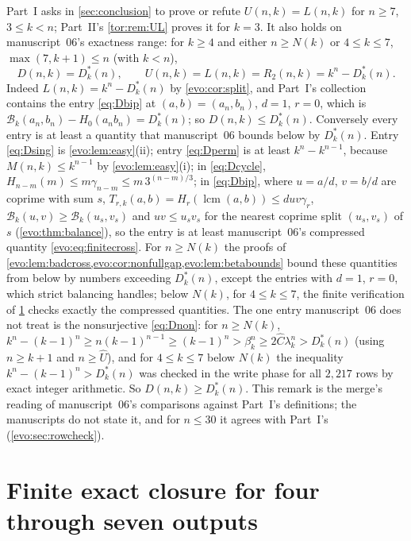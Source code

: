 \documentclass[11pt,a4paper]{article}
\numberwithin{equation}{section}
\theoremstyle{definition}
\theoremstyle{remark}
\newcommand{\lcm}{\operatorname{lcm}}
\newcommand{\Bip}{\mathcal B}
\begin{document}
\begin{remark}\label{evo:rem:UL}
Part~I asks in \cref{sec:conclusion} to prove or refute $U(n,k)=L(n,k)$ for
$n\ge7$, $3\le k<n$; Part~II's \cref{tor:rem:UL} proves it for $k=3$. It also
holds on manuscript~06's exactness range: for $k\ge4$ and either $n\ge N(k)$
or $4\le k\le7$, $\max(7,k+1)\le n$ (with $k<n$),
\[
 D(n,k)=D^*_k(n),\qquad U(n,k)=L(n,k)=R_2(n,k)=k^n-D^*_k(n).
\]
Indeed $L(n,k)=k^n-D^*_k(n)$ by \cref{evo:cor:split}, and Part~I's collection
contains the entry \eqref{eq:Dbip} at $(a,b)=(a_n,b_n)$, $d=1$, $r=0$, which
is $\Bip_k(a_n,b_n)-H_0(a_nb_n)=D^*_k(n)$; so $D(n,k)\le D^*_k(n)$. Conversely
every entry is at least a quantity that manuscript~06 bounds below by
$D^*_k(n)$. Entry \eqref{eq:Dsing} is \cref{evo:lem:easy}(ii); entry
\eqref{eq:Dperm} is at least $k^n-k^{n-1}$, because $M(n,k)\le k^{n-1}$ by
\cref{evo:lem:easy}(i); in \eqref{eq:Dcycle},
$H_{n-m}(m)\le m\gamma_{n-m}\le m\,3^{(n-m)/3}$; in \eqref{eq:Dbip}, where
$u=a/d$, $v=b/d$ are coprime with sum $s$, $T_{r,k}(a,b)=H_r(\lcm(a,b))\le
duv\gamma_r$, $\Bip_k(u,v)\ge\Bip_k(u_s,v_s)$ and $uv\le u_sv_s$ for the
nearest coprime split $(u_s,v_s)$ of $s$ (\cref{evo:thm:balance}), so the entry
is at least manuscript~06's compressed quantity \eqref{evo:eq:finitecross}.
For $n\ge N(k)$ the proofs of
\cref{evo:lem:badcross,evo:cor:nonfullgap,evo:lem:betabounds} bound these
quantities from below by numbers exceeding $D^*_k(n)$, except the entries with
$d=1$, $r=0$, which strict balancing handles; below $N(k)$, for $4\le k\le7$,
the finite verification of \cref{evo:sec:finite} checks exactly the
compressed quantities. The one entry manuscript~06 does not treat is the
nonsurjective \eqref{eq:Dnon}: for $n\ge N(k)$,
$k^n-(k-1)^n\ge n(k-1)^{n-1}\ge(k-1)^n>\beta_k^n\ge2\hat C\lambda_k^n>D^*_k(n)$
(using $n\ge k+1$ and $n\ge\hat U$), and for $4\le k\le7$ below $N(k)$ the
inequality $k^n-(k-1)^n>D^*_k(n)$ was checked in the write phase for all
$2{,}217$ rows by exact integer arithmetic. So $D(n,k)\ge D^*_k(n)$. This
remark is the merge's reading of manuscript~06's comparisons against Part~I's
definitions; the manuscripts do not state it, and for $n\le30$ it agrees with
Part~I's  (\cref{evo:sec:rowcheck}).
\end{remark}

\section{Finite exact closure for four through seven outputs}\label{evo:sec:finite}
\end{document}
